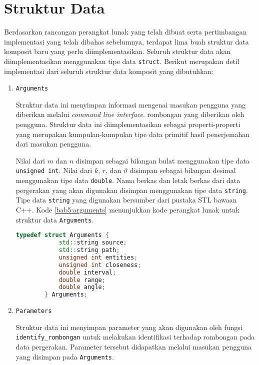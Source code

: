 \section{Struktur Data}
\label{sec:impl-struct}

Berdasarkan rancangan perangkat lunak yang telah dibuat serta pertimbangan implementasi yang telah dibahas sebelumnya, terdapat lima buah struktur data komposit baru yang perlu diimplementasikan. Seluruh struktur data akan diimplementasikan menggunakan tipe data \texttt{struct}. Berikut merupakan detil implementasi dari seluruh struktur data komposit yang dibutuhkan:

\begin{enumerate}
    \item \texttt{Arguments}
    
    Struktur data ini menyimpan informasi mengenai masukan pengguna yang diberikan melalui \textit{command line interface}. rombongan yang diberikan oleh pengguna. Struktur data ini diimplementasikan sebagai properti-properti yang merupakan kumpulan-kumpulan tipe data primitif hasil penerjemahan dari masukan pengguna.
    
    Nilai dari $m$ dan $n$ disimpan sebagai bilangan bulat menggunakan tipe data \texttt{unsigned int}. Nilai dari $k$, $r$, dan $\vartheta$ disimpan sebagai bilangan desimal menggunakan tipe data \texttt{double}. Nama berkas dan letak berkas dari data pergerakan yang akan digunakan disimpan menggunakan tipe data \texttt{string}. Tipe data \texttt{string} yang digunakan bersumber dari pustaka STL bawaan C++. Kode \ref{bab5:arguments} menunjukkan kode perangkat lunak untuk struktur data \texttt{Arguments}. 
    
    \begin{lstlisting}[language=C++, caption=Implementasi \texttt{Arguments}, label={bab5:arguments}]
        typedef struct Arguments {
            std::string source;
            std::string path;
            unsigned int entities;
            unsigned int closeness;
            double interval;
            double range;
            double angle;
        } Arguments;
    \end{lstlisting}
    
    \item \texttt{Parameters}
    
    Struktur data ini menyimpan parameter yang akan digunakan oleh fungsi \texttt{identify\_rombongan} untuk melakukan identifikasi terhadap rombongan pada data pergerakan. Parameter tersebut didapatkan melalui masukan pengguna yang disimpan pada \texttt{Arguments}.
    

\end{enumerate}
